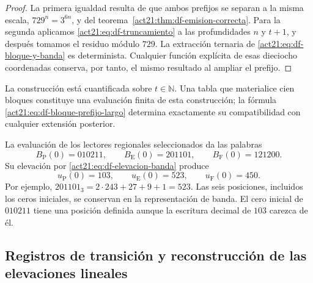 \begin{proof}
La primera igualdad resulta de que ambos prefijos se separan a la misma
escala, \(729^n=3^{6n}\), y del
teorema~\ref{act21:thm:df-emision-correcta}. Para la segunda aplicamos
\eqref{act21:eq:df-truncamiento} a las profundidades \(n\) y \(t+1\), y después
tomamos el residuo módulo \(729\). La extracción ternaria de
\eqref{act21:eq:df-bloque-y-banda} es determinista. Cualquier función explícita
de esas dieciocho coordenadas conserva, por tanto, el mismo resultado al
ampliar el prefijo.
\end{proof}

La construcción está cuantificada sobre \(t\in\mathbb N\). Una tabla que
materialice cien bloques constituye una evaluación finita de esta
construcción; la fórmula \eqref{act21:eq:df-bloque-prefijo-largo} determina
exactamente su compatibilidad con cualquier extensión posterior.

\begin{example}
La evaluación de los lectores regionales seleccionados da las palabras
\[
 B_{\mathrm P}(0)=010211,\qquad
 B_{\mathrm E}(0)=201101,\qquad
 B_{\mathrm F}(0)=121200.
\]
Su elevación por \eqref{act21:eq:df-elevacion-banda} produce
\[
 u_{\mathrm P}(0)=103,\qquad
 u_{\mathrm E}(0)=523,\qquad
 u_{\mathrm F}(0)=450.
\]
Por ejemplo,
\(201101_3=2\cdot243+27+9+1=523\).
Las seis posiciones, incluidos los ceros iniciales, se conservan en la
representación de banda. El cero inicial de \(010211\) tiene una posición
definida aunque la escritura decimal de \(103\) carezca de él.
\end{example}

\subsection{Registros de transición y reconstrucción de las elevaciones lineales}
\label{act21:subsec:df-registros-transicion}


